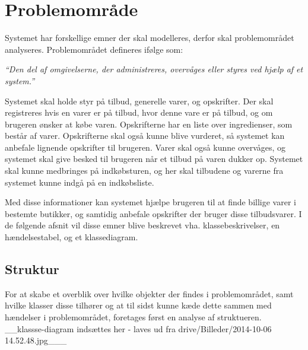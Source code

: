 \chapter{Problemområde}

Systemet har forskellige emner der skal modelleres, derfor skal problemområdet analyseres.
Problemområdet defineres ifølge \citep{OOA&D2001} som:

\textit{``Den del af omgivelserne, der administreres, overvåges eller styres ved hjælp af et system.''}

Systemet skal holde styr på tilbud, generelle varer, og opskrifter. 
Der skal registreres hvis en varer er på tilbud, hvor denne vare er på tilbud, og om brugeren ønsker at købe varen.
Opskrifterne har en liste over ingredienser, som består af varer. 
Opskrifterne skal også kunne blive vurderet, så systemet kan anbefale lignende opskrifter til brugeren.
Varer skal også kunne overvåges, og systemet skal give besked til brugeren når et tilbud på varen dukker op.
Systemet skal kunne medbringes på indkøbsturen, og her skal tilbudene og varerne fra systemet kunne indgå på en indkøbsliste.

Med disse informationer kan systemet hjælpe brugeren til at finde billige varer i bestemte butikker, og samtidig anbefale opskrifter der bruger disse tilbudsvarer.
I de følgende afsnit vil disse emner blive beskrevet vha. klassebeskrivelser, en hændelsestabel, og et klassediagram.

\section{Struktur}
For at skabe et overblik over hvilke objekter der findes i problemområdet, samt hvilke klasser disse tilhører og at til sidst kunne kæde dette sammen med hændelser i problemområdet, foretages først en analyse af struktueren.\\

__klassse-diagram indsættes her - laves ud fra drive/Billeder/2014-10-06 14.52.48.jpg___

